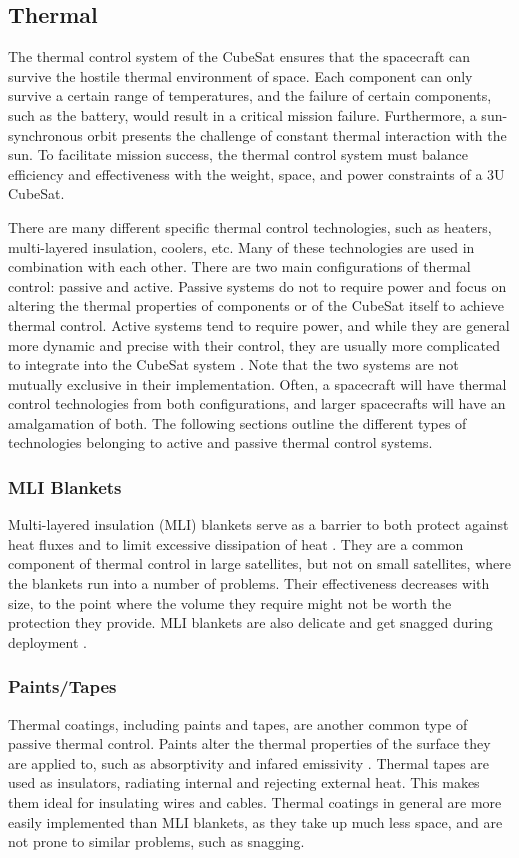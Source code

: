 
\subsection{Thermal}
The thermal control system of the CubeSat ensures that the spacecraft can survive the hostile thermal environment of space. Each component can only survive a certain range of temperatures, and the failure of certain components, such as the battery, would result in a critical mission failure. Furthermore, a sun-synchronous orbit presents the challenge of constant thermal interaction with the sun. To facilitate mission success, the thermal control system must balance efficiency and effectiveness with the weight, space, and power constraints of a 3U CubeSat. 

There are many different specific thermal control technologies, such as heaters, multi-layered insulation, coolers, etc. Many of these technologies are used in combination with each other. There are two main configurations of thermal control: passive and active. Passive systems do not to require power and focus on altering the thermal properties of components or of the CubeSat itself to achieve thermal control. Active systems tend to require power, and while they are general more dynamic and precise with their control, they are usually more complicated to integrate into the CubeSat system \cite{thermo}. Note that the two systems are not mutually exclusive in their implementation. Often, a spacecraft will have thermal control technologies from both configurations, and larger spacecrafts will have an amalgamation of both. The following sections outline the different types of technologies belonging to active and passive thermal control systems. \\
\subsubsection{MLI Blankets}
Multi-layered insulation (MLI) blankets serve as a barrier to both protect against heat fluxes and to limit excessive dissipation of heat \cite{thermo}. They are a common component of thermal control in large satellites, but not on small satellites, where the blankets run into a number of problems. Their effectiveness decreases with size, to the point where the volume they require might not be worth the protection they provide. MLI blankets are also delicate and get snagged during deployment \cite{thermo}. 

\subsubsection{Paints/Tapes}
Thermal coatings, including paints and tapes, are another common type of passive thermal control. Paints alter the thermal properties of the surface they are applied to, such as absorptivity and infared emissivity \cite{thermo}. Thermal tapes are used as insulators, radiating internal and rejecting external heat. This makes them ideal for insulating wires and cables. Thermal coatings in general are more easily implemented than MLI blankets, as they take up much less space, and are not prone to similar problems, such as snagging. 

